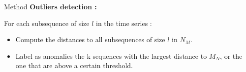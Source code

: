 \documentclass[french]{beamer}
\begin{document}
\begin{frame}{Method}
\textbf{Outliers detection :} 

For each subsequence of size $l$ in the time series : 
\begin{itemize}
    \item Compute the distances to all subsequences of size $l$ in $N_M$. 
    \item Label as anomalies the k sequences with the largest distance to $M_N$, or the one that are above a certain threshold.
\end{itemize}

\end{frame}
\end{document}
